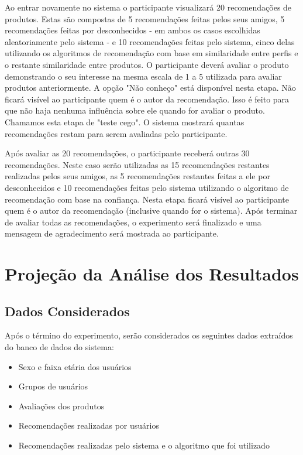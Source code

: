  Ao entrar novamente no sistema o participante visualizará 20 recomendações de produtos. Estas são compostas de 5 recomendações feitas pelos seus amigos, 5 recomendações feitas por desconhecidos - em ambos os casos escolhidas aleatoriamente pelo sistema - e 10 recomendações feitas pelo sistema, cinco delas utilizando os algoritmos de recomendação com base em similaridade entre perfis e o restante similaridade entre produtos. O participante deverá avaliar o produto demonstrando o seu interesse na mesma escala de 1 a 5 utilizada para avaliar produtos anteriormente. A opção "Não conheço" está disponível nesta etapa. Não ficará visível ao participante quem é o autor da recomendação. Isso é feito para que não haja nenhuma influência sobre ele quando for avaliar o produto. Chamamos esta etapa de "teste cego". O sistema mostrará quantas recomendações restam para serem avaliadas pelo participante.
 
 Após avaliar as 20 recomendações, o participante receberá outras 30 recomendações. Neste caso serão utilizadas as 15 recomendações restantes realizadas pelos seus amigos, as 5 recomendações restantes feitas a ele por desconhecidos e 10 recomendações feitas pelo sistema utilizando o algoritmo de recomendação com base na confiança. Nesta etapa ficará visível ao participante quem é o autor da recomendação (inclusive quando for o sistema). Após terminar de avaliar todas as recomendações, o experimento será finalizado e uma mensagem de agradecimento será mostrada ao participante.

\section{Projeção da Análise dos Resultados}

\subsection{Dados Considerados}

 Após o término do experimento, serão considerados os seguintes dados extraídos do banco de dados do sistema:

\begin{itemize}
	\item Sexo e faixa etária dos usuários
	\item Grupos de usuários
	\item Avaliações dos produtos
	\item Recomendações realizadas por usuários
	\item Recomendações realizadas pelo sistema e o algoritmo que foi utilizado
\end{itemize}


